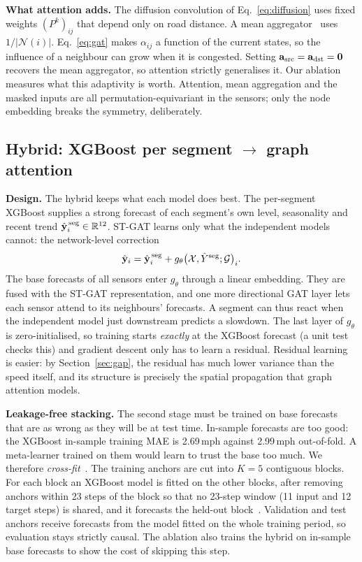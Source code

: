 \textbf{What attention adds.} The diffusion convolution of
Eq.~\eqref{eq:diffusion} uses fixed weights $(P^k)_{ij}$ that depend only on road
distance. A mean aggregator~\cite{hamilton2017sage} uses $1/|\mathcal{N}(i)|$.
Eq.~\eqref{eq:gat} makes $\alpha_{ij}$ a function of the current states, so the
influence of a neighbour can grow when it is congested. Setting
$\mathbf{a}_{\mathrm{src}}=\mathbf{a}_{\mathrm{dst}}=\mathbf{0}$ recovers the mean
aggregator, so attention strictly generalises it. Our ablation measures what this
adaptivity is worth. Attention, mean aggregation and the masked inputs are all
permutation-equivariant in the sensors; only the node embedding breaks the symmetry,
deliberately.

\subsection{Hybrid: XGBoost per segment \texorpdfstring{$\to$}{to} graph attention}
\label{sec:hybrid}
\textbf{Design.} The hybrid keeps what each model does best. The per-segment
XGBoost supplies a strong forecast of each segment's own level, seasonality and
recent trend $\hat{\mathbf{y}}^{\,\mathrm{seg}}_{i}\in\mathbb{R}^{12}$. ST-GAT learns only
what the independent models cannot: the network-level correction
\begin{equation}
\hat{\mathbf{y}}_{i}=\hat{\mathbf{y}}^{\,\mathrm{seg}}_{i}+g_\theta\big(\mathcal{X},\hat{Y}^{\mathrm{seg}};\mathcal{G}\big)_i .
\label{eq:hybrid}
\end{equation}
The base forecasts of all sensors enter $g_\theta$ through a linear embedding. They
are fused with the ST-GAT representation, and one more directional GAT layer lets
each sensor attend to its neighbours' forecasts. A segment can thus react when the
independent model just downstream predicts a slowdown. The last layer of $g_\theta$
is zero-initialised, so training starts \emph{exactly} at the XGBoost forecast (a
unit test checks this) and gradient descent only has to learn a residual. Residual
learning~\cite{he2016resnet,zhang2003hybrid} is easier: by
Section~\ref{sec:gap}, the residual has much lower variance than the speed itself,
and its structure is precisely the spatial propagation that graph attention models.

\textbf{Leakage-free stacking.} The second stage must be trained on base forecasts
that are as wrong as they will be at test time. In-sample forecasts are too good:
the XGBoost in-sample training MAE is 2.69\,mph against 2.99\,mph out-of-fold.
A meta-learner trained on them would learn to trust the base too much. We therefore
\emph{cross-fit}~\cite{wolpert1992stacking}. The training anchors are cut into
$K{=}5$ contiguous blocks. For each block an XGBoost model is fitted on the other
blocks, after removing anchors within 23 steps of the block so that no 23-step
window (11 input and 12 target steps) is shared, and it forecasts the held-out
block~\cite{bergmeir2012cv}. Validation and test anchors receive forecasts from
the model fitted on the whole training period, so evaluation stays strictly causal.
The ablation also trains the hybrid on in-sample base forecasts to show the cost of
skipping this step.

